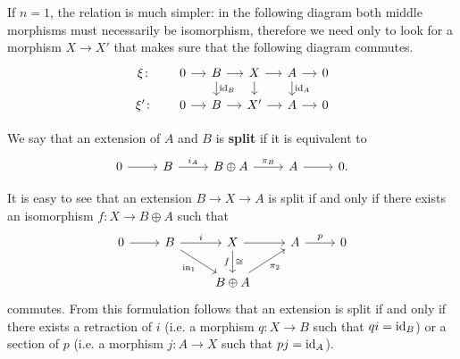 \begin{remark}
	If $n=1$, the relation is much simpler: in the following diagram both middle morphisms must necessarily be isomorphism, therefore we need only to look for a morphism $X \to X'$ that makes sure that the following diagram commutes.
	\[\begin{tikzcd}[sep=small]
		{\xi \colon} & 0 & B & X & A & 0 \\
		{\xi'\colon} & 0 & B & {X'} & A & 0
		\arrow[from=1-2, to=1-3]
		\arrow[from=1-3, to=1-4]
		\arrow[from=1-4, to=1-5]
		\arrow[from=1-5, to=1-6]
		\arrow[from=2-2, to=2-3]
		\arrow["{\id_B}", from=1-3, to=2-3]
		\arrow[from=2-3, to=2-4]
		\arrow[from=1-4, to=2-4]
		\arrow[from=2-4, to=2-5]
		\arrow["{\id_A}", from=1-5, to=2-5]
		\arrow[from=2-5, to=2-6]
	\end{tikzcd}\]

\end{remark}

\begin{definition}
	We say that an extension of $A$ and $B$ is \textbf{split} if it is equivalent to
	\[\begin{tikzcd}
	0 & B & {B\oplus A} & A & 0.
	\arrow[from=1-1, to=1-2]
	\arrow["{i_A}", from=1-2, to=1-3]
	\arrow["{\pi_B}", from=1-3, to=1-4]
	\arrow[from=1-4, to=1-5]
\end{tikzcd}\]
\end{definition}


It is easy to see that an extension $B\longrightarrow X \longrightarrow A$ is split if and only if there exists an isomorphism $f \colon X \longrightarrow B \oplus A$ such that
\[\begin{tikzcd}
	0 & B & X & A & 0 \\
	&& {B \oplus A}
	\arrow[from=1-1, to=1-2]
	\arrow["i", from=1-2, to=1-3]
	\arrow["{\inn_1}"', from=1-2, to=2-3]
	\arrow[from=1-3, to=1-4]
	\arrow["\cong", "f"', from=1-3, to=2-3]
	\arrow["p", from=1-4, to=1-5]
	\arrow["{\pi_2}"', from=2-3, to=1-4]
\end{tikzcd}\]
commutes. From this formulation follows that an extension is split if and only if there exists a retraction of $i$ (i.e. a morphism $q\colon X \longrightarrow B$ such that $qi = \mathrm{id}_B$) or a section of $p$ (i.e. a morphism $j\colon A \longrightarrow X$ such that $pj = \mathrm{id}_A$).

